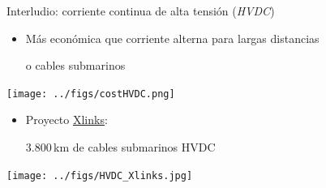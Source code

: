 \documentclass[aspectratio=169, usenames,svgnames,dvipsnames]{beamer}
\begin{document}
\begin{frame}{Interludio: \hspace{3mm}corriente continua de alta tensión \hspace{3mm}(\textit{HVDC})}
    \begin{minipage}[c]{0.49\linewidth} 
        
        \vspace{-2.75mm}
        \begin{itemize}
            \item Más \alert{económica} que corriente alterna para \alert{largas distancias} 
            
            o \alert{cables submarinos}
        \end{itemize}

        \vspace{1mm}
        \begin{center}    
            \texttt{[image: ../figs/costHVDC.png]}
        \end{center}
    \end{minipage}
    \hfill%
    \begin{minipage}[c]{0.49\linewidth}
    
        \vspace{5mm}
        \begin{itemize}
            \item Proyecto \href{https://xlinks.co/morocco-uk-power-project/}{Xlinks}: 
            
            $3{.}800$\,\si{\kilo\meter} de cables submarinos HVDC
        \end{itemize}

        \vspace{-4mm}
        \begin{center}    
            \texttt{[image: ../figs/HVDC\_Xlinks.jpg]}
        \end{center}
    \end{minipage}
\end{frame}
\end{document}

